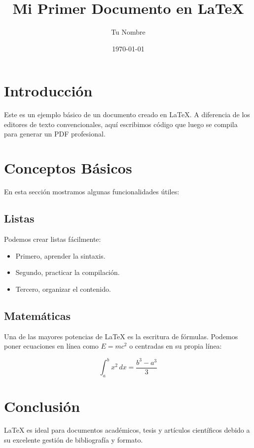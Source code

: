 \documentclass[12pt]{article}
\title{Mi Primer Documento en \LaTeX}
\author{Tu Nombre}
\date{\today}
\begin{document}
\maketitle %

\tableofcontents %
\newpage

\section{Introducción}
Este es un ejemplo básico de un documento creado en \LaTeX. A diferencia de los editores de texto convencionales, aquí escribimos código que luego se compila para generar un PDF profesional.

\section{Conceptos Básicos}
En esta sección mostramos algunas funcionalidades útiles:

\subsection{Listas}
Podemos crear listas fácilmente:
\begin{itemize}
    \item Primero, aprender la sintaxis.
    \item Segundo, practicar la compilación.
    \item Tercero, organizar el contenido.
\end{itemize}

\subsection{Matemáticas}
Una de las mayores potencias de \LaTeX{} es la escritura de fórmulas. Podemos poner ecuaciones en línea como $E = mc^2$ o centradas en su propia línea:

\[
\int_{a}^{b} x^2 \, dx = \frac{b^3 - a^3}{3}
\]

\section{Conclusión}
\LaTeX{} es ideal para documentos académicos, tesis y artículos científicos debido a su excelente gestión de bibliografía y formato.
\end{document}
